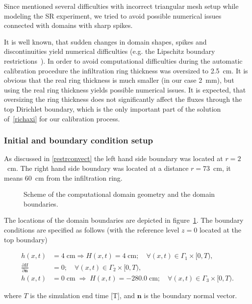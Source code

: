\documentclass[review]{elsarticle}
\newenvironment{lineq}
    {\begin{linenomath*}
    \begin{equation}
    }
    { 
    \end{equation} 
    \end{linenomath*}
    }
\renewcommand{\vec}{\mathbf}
\begin{document}
Since \cite{Dusek} mentioned several difficulties with incorrect triangular mesh setup while modeling the SR experiment, we tried to avoid possible numerical issues connected with domains with sharp spikes.


It is well known, that sudden changes in domain shapes, spikes and discontinuities yield numerical difficulties (e.g. the Lipschitz boundary restrictions~\citep{braess}).
In order to avoid computational difficulties during the automatic calibration procedure the infiltration ring thickness was oversized  to 2.5~cm. It is obvious that the real ring thickness is much smaller (in our case 2~mm), but using the real ring thickness yields possible numerical issues.  It is expected, that oversizing the ring thickness does not significantly affect the fluxes through the top Dirichlet boundary, which is the only important part of the solution of~\eqref{richaxi} for our calibration process.

\subsubsection{Initial and boundary condition setup}

As discussed in \ref{restrconvect} the left hand side boundary was located at $r=2$~cm. The right hand side boundary was located at a distance $r=73$~cm, it means 60~cm from the infiltration ring. 

 \begin{figure}
\centering
{}
 \caption{Scheme of the computational domain geometry and the domain boundaries.}
 \label{valecbc}
\end{figure}


The locations of the domain boundaries are depicted in figure~\ref{valecbc}. The boundary conditions are specified as follows (with the reference level $z=0$ located at the top boundary)
\begin{lineq} 
\begin{split}
h(x,t) &= 4 \; \mbox{cm} \Rightarrow H(x,t) = 4 \; \mbox{cm}; \quad \forall (x,t) \in \Gamma_1 \times [0,T), \\
\frac{\partial H}{\partial \vec{n}} &= 0; \quad \forall (x,t) \in \Gamma_2 \times [0,T), \\
h(x,t) &= 0  \; \mbox{cm}  \; \Rightarrow \; H(x,t) = -280.0  \; \mbox{cm}; \quad \forall (x,t) \in \Gamma_3 \times [0,T).
\end{split}
\end{lineq}
where $T$ is the simulation end time [T], and $\vec{n}$ is the boundary normal vector.
\end{document}
